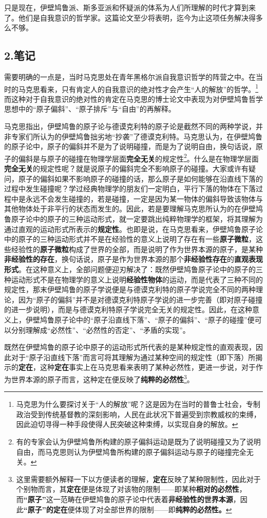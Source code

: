 \documentclass[a4paper,twoside,12pt]{ctexart}
\begin{document}
只是现在，伊壁鸠鲁派、斯多亚派和怀疑派的体系为人们所理解的时代才算到来了。他们是自我意识的哲学家。这篇论文至少将表明，迄今为止这项任务解决得多么不够。

\newpage
\subsection{2.笔记}
需要明确的一点是，当时马克思处在青年黑格尔派自我意识哲学的阵营之中。在当时的马克思看来，只有肯定人的自我意识的绝对性才会产生“人的解放”的哲学。\footnote{马克思为什么要探讨关于“人的解放”呢？这是因为在当时的普鲁士社会，专制政治受到传统基督教的深刻影响，人民在此状况下普遍受到宗教威权的束缚，因此迫切寻得一种手段使得人民突破这种束缚，以实现自身的解放。}而这种对于自我意识的绝对性的肯定在马克思的博士论文中表现为对伊壁鸠鲁哲学思想中的“原子偏斜”、“原子排斥”与“自由”的再解释。

马克思指出，伊壁鸠鲁的原子论与德谟克利特的原子论是截然不同的两种学说，并非专家们所认为的伊壁鸠鲁拙劣地“抄袭”了德谟克利特。马克思认为，在伊壁鸠鲁的原子论中，原子的偏斜并不是为了说明碰撞，而是为了说明自由，换句话说，原子的偏斜是与原子的碰撞在物理学层面\textbf{完全无关}的规定性\footnote{有的专家会认为伊壁鸠鲁所构建的原子偏斜运动是既为了说明碰撞又为了说明自由，而马克思则认为伊壁鸠鲁所构建的原子偏斜运动与原子的碰撞完全无关。}。什么是在物理学层面\textbf{完全无关}的规定性呢？就是说原子的偏斜完全不影响原子的碰撞。大家或许有疑问，原子的偏斜如果不影响原子的碰撞的话，那么原子是如何能够在沿直线下落的过程中发生碰撞呢？学过经典物理学的朋友们一定明白，平行下落的物体在下落过程中是永远不会发生碰撞的，若是碰撞，一定是因为某一物体的偏斜导致该物体与其他物体处于非平行的状态而发生的。因此，若是要理解马克思所认为的在伊壁鸠鲁原子论中的原子的三种运动形式，就一定要跳出纯粹物理学的框架，将其理解为通过直观的运动形式所表示的\textbf{规定性}。也即是说，在马克思看来，伊壁鸠鲁原子论中的原子的三种运动形式并不是在经验性的意义上说明了存在有一些\textbf{原子微粒}，这些经验性的\textbf{原子微粒}构成了世界的全部，而是说明了作为世界本源的原子，是某种\textbf{非经验性的存在}，换句话说，原子是作为世界本源的那个\textbf{非经验性存在}的\textbf{直观表现形式}。在这种意义上，全部问题便迎刃解决了：既然伊壁鸠鲁原子论中的原子的三种运动形式不是在物理学的意义上说明\textbf{经验性物体}的运动，而是代表了三种不同的规定性，那末伊壁鸠鲁的原子学说便是与德谟克利特的原子学说完全不同的两种理论，因为“原子的偏斜”并不是对德谟克利特原子学说的进一步完善（即对原子碰撞的进一步说明），而是与德谟克利特原子学说完全无关的规定性。因此，在这种意义上，伊壁鸠鲁原子论中的“原子沿直线下落”、“原子的偏斜”、“原子的碰撞”便可以分别理解成“必然性”、“必然性的否定”、“矛盾的实现”。

既然在伊壁鸠鲁的原子论中原子的运动形式所代表的是某种规定性的直观表现，因此对于“原子沿直线下落”而言可将其理解为通过某种空间的规定性（即下落）所揭示的\textbf{定在}，这种\textbf{定在}事实上在马克思看来表明了某种必然性，更进一步说，对于作为世界本源的原子而言，这种定在便反映了\textbf{纯粹的必然性}\footnote{这里需要额外解释一下以方便读者的理解，\textbf{定在}反映了某种限制性，因此对于个别物而言，其\textbf{定在}便是体现了对该物的限制——即某种\textbf{相对的必然性}，而\textbf{“原子”}这一范畴在伊壁鸠鲁的原子论中代表着\textbf{非经验性的世界本源}，因此\textbf{“原子”的定在}便体现了对全部世界的限制——即\textbf{纯粹的必然性。}}。
\end{document}
